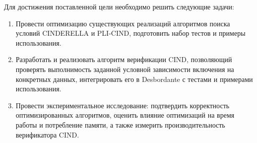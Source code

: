 Для достижения поставленной цели необходимо решить следующие задачи:
\begin{enumerate}
    \item Провести оптимизацию существующих реализаций алгоритмов поиска условий CINDERELLA и PLI-CIND, подготовить набор тестов и примеры использования.
    \item Разработать и реализовать алгоритм верификации CIND, позволяющий проверять выполнимость заданной условной зависимости включения на конкретных данных, интегрировать его в Desbordante с тестами и примерами использования.
    \item Провести экспериментальное исследование: подтвердить корректность оптимизированных алгоритмов, оценить влияние оптимизаций на время работы и потребление памяти, а также измерить производительность верификатора CIND.
\end{enumerate}
